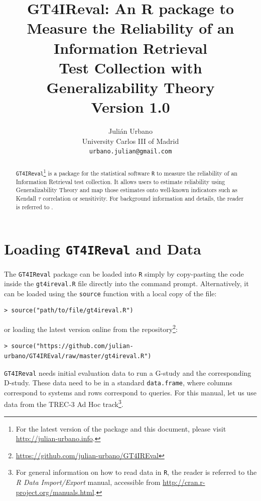 \documentclass[twoside]{article}
\begin{document}
\title{\textbf{GT4IReval: An R package to Measure the Reliability of an Information Retrieval\\Test Collection with Generalizability Theory\\{\Large Version 1.0}}}
\author{Juli\'an Urbano\\University Carlos III of Madrid\\\texttt{urbano.julian@gmail.com}}
\maketitle

\begin{abstract}
\noindent\texttt{GT4IReval}\footnote{For the latest version of the package and this document, please visit \url{http://julian-urbano.info}.} is a package for the statistical software \texttt{R} to measure the reliability of an Information Retrieval test collection. It allows users to estimate reliability using Generalizability Theory and map those estimates onto well-known indicators such as Kendall $\tau$ correlation or sensitivity. For background information and details, the reader is referred to \cite{Urbano2013:measurement}.
\end{abstract}

\section{Loading \texttt{GT4IReval} and Data}

The \texttt{GT4IReval} package can be loaded into \texttt{R} simply by copy-pasting the code inside the \texttt{gt4ireval.R} file directly into the command prompt. Alternatively, it can be loaded using the \texttt{source} function with a local copy of the file:
{\small\begin{verbatim}
> source("path/to/file/gt4ireval.R")
\end{verbatim}}
\noindent or loading the latest version online from the repository\footnote{\url{https://github.com/julian-urbano/GT4IREval}}:
{\small\begin{verbatim}
> source("https://github.com/julian-urbano/GT4IREval/raw/master/gt4ireval.R")
\end{verbatim}}

\texttt{GT4IReval} needs initial evaluation data to run a G-study and the corresponding D-study. These data need to be in a standard \texttt{data.frame}, where columns correspond to systems and rows correspond to queries. For this manual, let us use data from the TREC-3 Ad Hoc track\footnote{For general information on how to read data in \texttt{R}, the reader is referred to the \textsl{R Data Import/Export} manual, accessible from \url{http://cran.r-project.org/manuals.html}.}.
\end{document}
